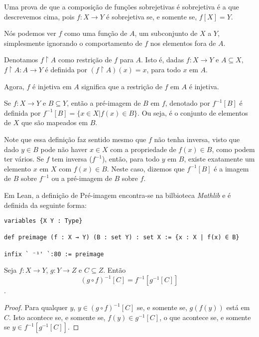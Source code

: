 Uma prova de que a composição de funções sobrejetivas é sobrejetiva é a que
descrevemos cima, pois $f: X \to Y$ é sobrejetiva se, e somente se, $f[X] =
Y$.

Nós podemos ver $f$ como uma função de $A$, um subconjunto de $X$ a $Y$,
simplesmente ignorando o comportamento de $f$ nos elementos fora de $A$.

\begin{definition}
    \label{def9}
    Denotamos $f \upharpoonright A$ como restrição de $f$ para $A$. Isto é,
    dadas $f: X \to Y$ e $A \subseteq X$, $f \upharpoonright A : A \to Y$ é
    definida por $(f \upharpoonright A)(x) = x$, para todo $x$ em $A$.
\end{definition}

Agora, $f$ é injetiva em $A$ significa que a restrição de $f$ em $A$ é
injetiva.

\begin{definition}
    \label{def10}
    Se $f: X \to Y$ e $B \subseteq Y$, então a pré-imagem de $B$ em $f$,
    denotado por $f^{-1}[B]$ é definida por $f^{-1}[B] = \{x \in X | f(x) \in
    B\}$. Ou seja, é o conjunto de elementos de $X$ que são mapeados em $B$.
\end{definition}

Note que essa definição faz sentido mesmo que $f$ não tenha inversa, visto que
dado $y \in B$ pode não haver $x \in X$ com a propriedade de $f(x) \in B$,
como podem ter vários. Se $f$ tem inversa ($f^{-1}$), então, para todo $y$ em
$B$, existe exatamente um elemento $x$ em $X$ com $f(x) \in B$. Neste caso,
dizemos que $f^{-1}[B]$ é a imagem de $B$ sobre $f^{-1}$ ou a pré-imagem de
$B$ sobre $f$.

Em Lean, a definição de Pré-imagem encontra-se na bilbioteca \textit{Mathlib}
e é definida da seguinte forma: 

\begin{lstlisting}
variables {X Y : Type}

def preimage (f : X → Y) (B : set Y) : set X := {x : X | f(x) ∈ B}

infix ` ⁻¹' `:80 := preimage
\end{lstlisting}


\begin{theorem}
    Seja $f: X \to Y$, $g: Y \to Z$ e $C \subseteq Z$. Então $$(g \circ
    f)^{-1}[C] = f^{-1}[g^{-1}[C]]$$.
\end{theorem}
\begin{proof}
    Para qualquer $y$, $y \in (g \circ f)^{-1}[C]$ se, e somente se, $g(f(y))$
    está em $C$. Isto acontece se, e somente se, $f(y) \in g^{-1}[C]$, o que
    acontece se, e somente se $y \in f^{-1}[g^{-1}[C]]$.
\end{proof}

